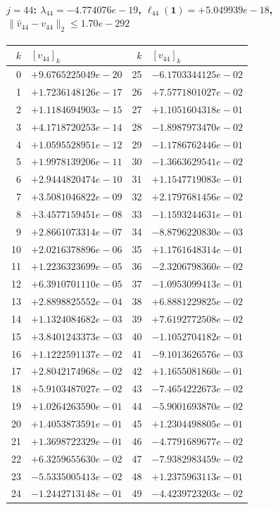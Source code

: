 \paragraph{$j = 44$: $\lambda_{44} = -4.774076e-19$, \quad $\ell_{44}(\mathbf{1}) = +5.049939e-18$, \quad $\|\hat{v}_{44} - v_{44}\|_2 \leq 1.70e-292$}
\begin{center}
{\footnotesize
\begin{tabular}{r@{\;\;}l@{\quad}r@{\;\;}l}
\toprule
$k$ & $[v_{44}]_k$ & $k$ & $[v_{44}]_k$ \\
\midrule
0 & $+9.6765225049e-20$ & 25 & $-6.1703344125e-02$ \\
1 & $+1.7236148126e-17$ & 26 & $+7.5771801027e-02$ \\
2 & $+1.1184694903e-15$ & 27 & $+1.1051604318e-01$ \\
3 & $+4.1718720253e-14$ & 28 & $-1.8987973470e-02$ \\
4 & $+1.0595528951e-12$ & 29 & $-1.1786762446e-01$ \\
5 & $+1.9978139206e-11$ & 30 & $-1.3663629541e-02$ \\
6 & $+2.9444820474e-10$ & 31 & $+1.1547719083e-01$ \\
7 & $+3.5081046822e-09$ & 32 & $+2.1797681456e-02$ \\
8 & $+3.4577159451e-08$ & 33 & $-1.1593244631e-01$ \\
9 & $+2.8661073314e-07$ & 34 & $-8.8796220830e-03$ \\
10 & $+2.0216378896e-06$ & 35 & $+1.1761648314e-01$ \\
11 & $+1.2236323699e-05$ & 36 & $-2.3206798360e-02$ \\
12 & $+6.3910701110e-05$ & 37 & $-1.0953099413e-01$ \\
13 & $+2.8898825552e-04$ & 38 & $+6.8881229825e-02$ \\
14 & $+1.1324084682e-03$ & 39 & $+7.6192772508e-02$ \\
15 & $+3.8401243373e-03$ & 40 & $-1.1052704182e-01$ \\
16 & $+1.1222591137e-02$ & 41 & $-9.1013626576e-03$ \\
17 & $+2.8042174968e-02$ & 42 & $+1.1655081860e-01$ \\
18 & $+5.9103487027e-02$ & 43 & $-7.4654222673e-02$ \\
19 & $+1.0264263590e-01$ & 44 & $-5.9001693870e-02$ \\
20 & $+1.4053873591e-01$ & 45 & $+1.2304498805e-01$ \\
21 & $+1.3698722329e-01$ & 46 & $-4.7791689677e-02$ \\
22 & $+6.3259655630e-02$ & 47 & $-7.9382983459e-02$ \\
23 & $-5.5335005413e-02$ & 48 & $+1.2375963113e-01$ \\
24 & $-1.2442713148e-01$ & 49 & $-4.4239723203e-02$ \\
\bottomrule
\end{tabular}
}
\end{center}


